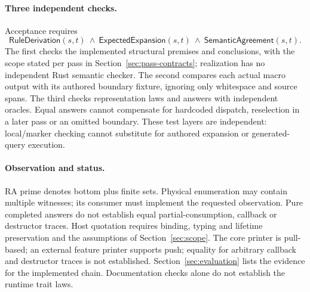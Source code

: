 \paragraph{Three independent checks.}
Acceptance requires
\[
 \mathsf{RuleDerivation}(s,t)\ \land\
 \mathsf{ExpectedExpansion}(s,t)\ \land\
 \mathsf{SemanticAgreement}(s,t).
\]
The first checks the implemented structural premises and conclusions, with the
scope stated per pass in Section~\ref{sec:pass-contracts}; realization has no
independent Rust semantic checker. The second compares
each actual macro output with its authored boundary fixture, ignoring only
whitespace and source spans. The third checks representation laws and answers
with independent oracles. Equal answers cannot compensate for hardcoded dispatch,
reselection in a later pass or an omitted boundary. These test layers are independent: local/marker checking cannot substitute
for authored expansion or generated-query execution.

\paragraph{Observation and status.}
RA prime denotes bottom plus finite sets. Physical enumeration may contain multiple witnesses; its
consumer must implement the requested observation. Pure completed answers do
not establish equal partial-consumption, callback or destructor traces. Host
quotation requires binding, typing and lifetime preservation and the assumptions
of Section~\ref{sec:scope}. The core printer is pull-based; an external feature printer supports push; equality for
arbitrary callback and destructor traces is not established.
Section~\ref{sec:evaluation} lists the evidence for the implemented chain.
Documentation checks alone do not establish the runtime trait laws.
